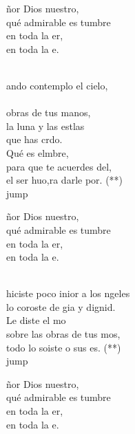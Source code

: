 \begin{cancion}%
	\begin{chorus}%
	ñor Dios nuestro,\\
	qué admirable es tumbre\\
	en toda la er,\\
	en toda la e.\\
	\end{chorus}%
	\jump\\
	ando contemplo el cielo,\\
	\jump\\
obras de tus manos,\\
	la luna y las estlas\\
	que has crdo.\\
	Qué es elmbre,\\
	para que te acuerdes del, \\
	el ser huo,ra darle por. (**)\\jump\\
	\begin{chorus}%
	ñor Dios nuestro,\\
	qué admirable es tumbre\\
	en toda la er,\\
	en toda la e.\\
	\end{chorus}%
	\jump\\
	 hiciste poco inior a los ngeles\\
	lo coroste de gia y dignid.\\
	Le diste el mo \\
	sobre las obras de tus mos,\\
	todo lo soiste o sus es. (**)\\jump\\
	\begin{chorus}%
	ñor Dios nuestro,\\
	qué admirable es tumbre\\
	en toda la er,\\
	en toda la e.\\
	\end{chorus}%
	\jump\\
\end{cancion}%
